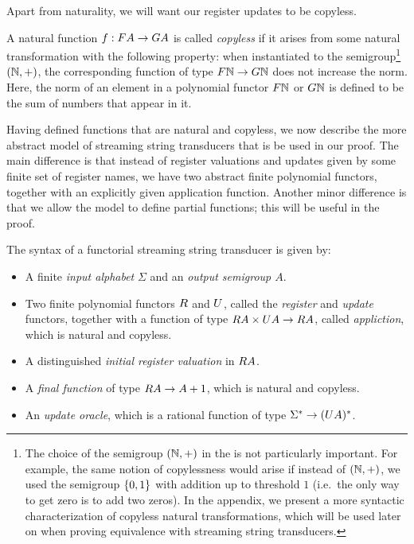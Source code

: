 Apart from naturality, we will want our register updates to be copyless. 

\begin{definition} \label{def:copyless} A natural function $f : \functor A \to \functorg A$ is  called \emph{copyless} if it arises from some natural transformation with the following property:  when instantiated to the semigroup\footnote{The choice of the semigroup $({\mathbb N},+)$ in the  is not particularly important. For example, the same notion of copylessness would arise if instead of $({\mathbb N},+)$, we used the semigroup $\{0,1\}$ with addition up to threshold $1$ (i.e.~the only way to get zero is to add two zeros). In the appendix, we present a more syntactic characterization of copyless natural transformations, which will be used later on when proving equivalence with streaming string transducers. 
    } $({\mathbb N},+)$, the corresponding function of type $\functor \Nat \to \functorg \Nat$ 
    does not increase the norm. Here, the norm of an element in a polynomial functor $\functor \Nat$ or $\functorg \Nat$ is defined to be the sum of numbers that appear in it.
\end{definition}





Having defined functions that are natural and copyless, we now describe the more abstract model of streaming string transducers that is be used in our proof. The main difference is that instead of register valuations and updates given by some finite set of register names, we have two abstract finite polynomial functors, together with an explicitly given application function. Another minor difference is that we allow the model to define partial functions; this will be useful in the proof.


\begin{definition}\label{def:functorial-sst}
    The syntax of a functorial streaming string transducer is given by:
    \begin{itemize}
        \item A finite \emph{input alphabet} $\Sigma$ and an \emph{output semigroup $A$}.
    \item Two finite polynomial functors $\functorr$ and $\functoru$, called the \emph{register} and \emph{update} functors, together with a function of type $\functorr A \times \functoru A \to \functorr A$, called \emph{appliction}, which is natural and copyless.
    \item A distinguished \emph{initial register valuation}  in $\functorr A$.
    \item A \emph{final function} of type $\functorr A \to A + 1$, which is natural and copyless.
    \item An \emph{update oracle}, which is a rational function of type $\Sigma^* \to (\functoru A)^*$.
    \end{itemize}
\end{definition}

